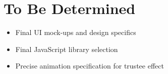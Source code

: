 \documentclass[11pt]{scrreprt}
\begin{document}

\chapter{To Be Determined}
\begin{itemize}
  \item Final UI mock-ups and design specifics
  \item Final JavaScript library selection
  \item Precise animation specification for trustee effect
\end{itemize}
\end{document}
